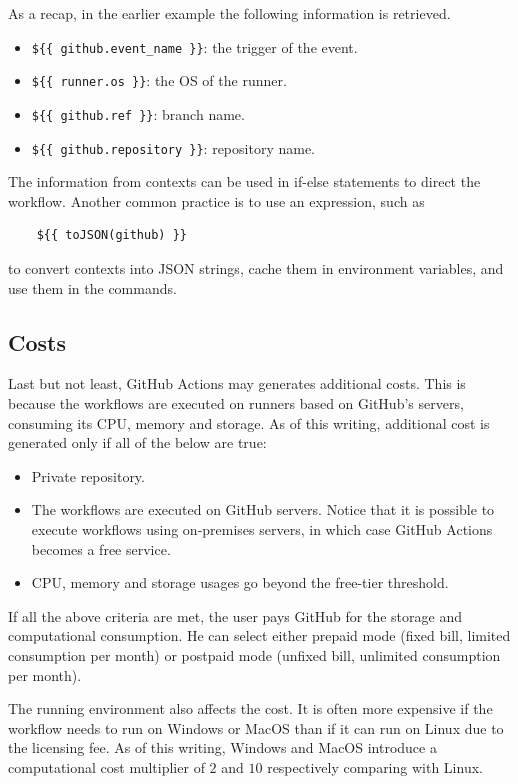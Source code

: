 As a recap, in the earlier example the following information is retrieved.
\begin{itemize}
	\item \verb|${{ github.event_name }}|: the trigger of the event.
	\item \verb|${{ runner.os }}|: the OS of the runner.
	\item \verb|${{ github.ref }}|: branch name.
	\item \verb|${{ github.repository }}|: repository name.
\end{itemize}

The information from contexts can be used in if-else statements to direct the workflow. Another common practice is to use an expression, such as
\begin{lstlisting}
	${{ toJSON(github) }}
\end{lstlisting}
to convert contexts into JSON strings, cache them in environment variables, and use them in the commands.

\subsection{Costs}

Last but not least, GitHub Actions may generates additional costs. This is because the workflows are executed on runners based on GitHub's servers, consuming its CPU, memory and storage. As of this writing, additional cost is generated only if all of the below are true:
\begin{itemize}
	\item Private repository.
	\item The workflows are executed on GitHub servers. Notice that it is possible to execute workflows using on-premises servers, in which case GitHub Actions becomes a free service.
	\item CPU, memory and storage usages go beyond the free-tier threshold.
\end{itemize}

If all the above criteria are met, the user pays GitHub for the storage and computational consumption. He can select either prepaid mode (fixed bill, limited consumption per month) or postpaid mode (unfixed bill, unlimited consumption per month).

The running environment also affects the cost. It is often more expensive if the workflow needs to run on Windows or MacOS than if it can run on Linux due to the licensing fee. As of this writing, Windows and MacOS introduce a computational cost multiplier of $2$ and $10$ respectively comparing with Linux.

